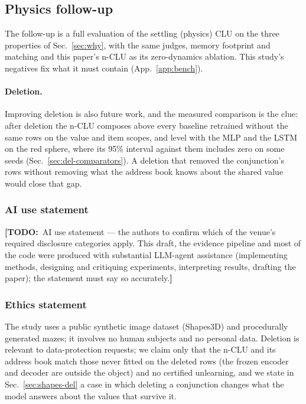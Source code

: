 \documentclass{article} %
\newcommand{\TODO}[1]{{\color{orange}\textbf{[TODO:}~#1\textbf{]}}}
\begin{document}
\subsection{Physics follow-up}
\label{sec:followup}

The follow-up is a full evaluation of the settling (physics) CLU on the three properties of Sec.~\ref{sec:why}, with the same judges, memory footprint and matching and this paper's n-CLU as its zero-dynamics ablation. This study's negatives fix what it must contain (App.~\ref{app:bench}).

\paragraph{Deletion.} Improving deletion is also future work, and the measured comparison is
the clue: after deletion the n-CLU composes above every baseline retrained without the same rows on
the value and item scopes, and level with the MLP and the LSTM on the red sphere, where its 95\% %
interval against them includes zero on some seeds (Sec.~\ref{sec:del-comparators}). A deletion that
removed the conjunction's rows without removing what the address book knows about the shared value
would close that gap.

\subsubsection*{AI use statement}
\TODO{AI use statement --- the authors to confirm which of the venue's required disclosure categories
apply. This draft, the evidence pipeline and most of the code were produced with substantial LLM-agent
assistance (implementing methods, designing and critiquing experiments, interpreting results,
drafting the paper); the statement must say so accurately.}

\subsubsection*{Ethics statement}
The study uses a public synthetic image dataset (Shapes3D) and procedurally generated mazes; it
involves no human subjects and no personal data. Deletion is relevant to data-protection
requests; we claim only that the n-CLU and its address book match those never fitted on the deleted
rows (the frozen encoder and decoder are outside the object) and no certified unlearning, and
we state in Sec.~\ref{sec:shapes-del} a case in which deleting a conjunction changes what the
model answers about the values that survive it.
\end{document}

